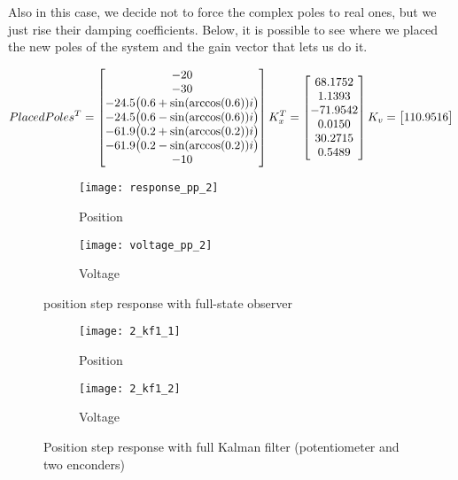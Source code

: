 Also in this case, we decide not to force the complex poles to real ones, but we just rise their damping coefficients. Below, it is possible to see where we placed the new poles of the system and the gain vector that lets us do it.

\begin{equation}
	PlacedPoles^{T} =
	\begin{bmatrix}
		-20 \\ -30 \\ -24.5 \bigl{(} 0.6+\sin(\arccos(0.6))i \bigr{)} \\ -24.5 \bigl{(} 0.6-\sin(\arccos(0.6))i \bigr{)} \\
		-61.9 \bigl{(} 0.2+\sin(\arccos(0.2))i \bigr{)} \\ -61.9 \bigl{(} 0.2-\sin(\arccos(0.2))i \bigr{)} \\ -10
	\end{bmatrix}
	K_x^{T} =
	\begin{bmatrix}
		68.1752  \\  1.1393 \\ -71.9542 \\   0.0150 \\  30.2715  \\  0.5489
	\end{bmatrix}
	\\
	K_v =
	\begin{bmatrix}
		110.9516
	\end{bmatrix}
\end{equation}

\begin{figure*}[h]
	\centering
	\begin{subfigure}{0.5\columnwidth}
		\texttt{[image: response\_pp\_2]}
		\caption{Position}
	\end{subfigure}
	\begin{subfigure}{0.45\columnwidth}
		\texttt{[image: voltage\_pp\_2]}
		\caption{Voltage}
	\end{subfigure}
	\caption{position step response with full-state observer}
\end{figure*}

\begin{figure*}[h]
	\centering
	\begin{subfigure}{0.5\columnwidth}
		\texttt{[image: 2\_kf1\_1]}
		\caption{Position}
	\end{subfigure}
	\begin{subfigure}{0.45\columnwidth}
		\texttt{[image: 2\_kf1\_2]}
		\caption{Voltage}
	\end{subfigure}
	\caption{Position step response with full Kalman filter (potentiometer and two enconders)}
\end{figure*}

